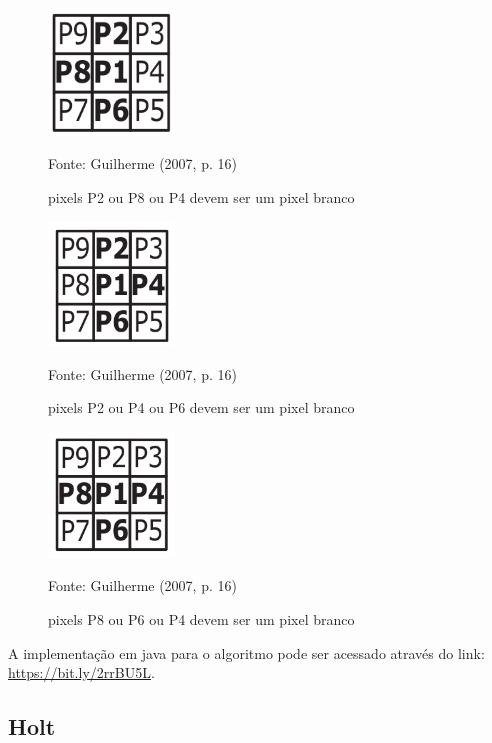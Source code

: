 \documentclass[
	12pt,				%
	oneside,			%
	a4paper,			%
	english,			%
	french,				%
	spanish,			%
	brazil,				%
	]{abntex2}
\begin{document}
\begin{figure}[ht]
\centering
\caption{pixels P2 ou P8 ou P4 devem ser um pixel branco}
\includegraphics[width=0.3\textwidth]{imagens/zhangsuen2.png}

Fonte: Guilherme (2007, p. 16)
\label{fig:zhangsuen2}
\end{figure}

\begin{figure}[ht]
\centering
\caption{pixels P2 ou P4 ou P6 devem ser um pixel branco}
\includegraphics[width=0.3\textwidth]{imagens/zhangsuen3.png}

Fonte: Guilherme (2007, p. 16)
\label{fig:zhangsuen3}
\end{figure}

\begin{figure}[ht]
\centering
\caption{pixels P8 ou P6 ou P4 devem ser um pixel branco}
\includegraphics[width=0.3\textwidth]{imagens/zhangsuen4.png}

Fonte: Guilherme (2007, p. 16)
\label{fig:zhangsuen4}
\end{figure}

A implementação em java para o algoritmo pode ser acessado através do link: \url{https://bit.ly/2rrBU5L}.

\subsection{Holt}    
\end{document}
